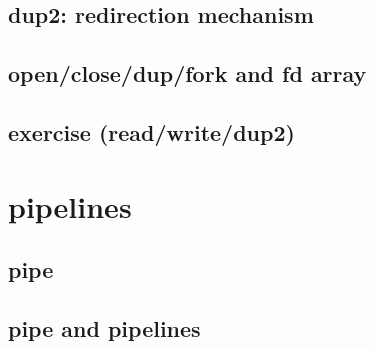 

\subsection{dup2: redirection mechanism}



\subsection{open/close/dup/fork and fd array}



\subsection{exercise (read/write/dup2)}



\section{pipelines}

\subsection{pipe}



\subsection{pipe and pipelines}



